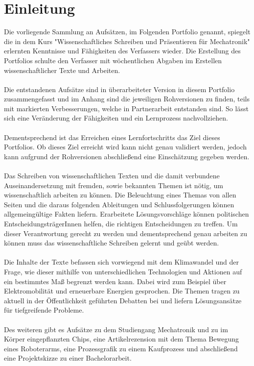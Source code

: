 \chapter{Einleitung}
Die vorliegende Sammlung an Aufsätzen, im Folgenden Portfolio genannt, spiegelt die in dem Kurs "Wissenschaftliches Schreiben und Präsentieren für Mechatronik" erlernten Kenntnisse und Fähigkeiten des Verfassers wieder. Die Erstellung des Portfolios schulte den Verfasser mit wöchentlichen Abgaben im Erstellen wissenschaftlicher Texte und Arbeiten. \\\\%
Die entstandenen Aufsätze sind in überarbeiteter Version in diesem Portfolio zusammengefasst und im Anhang sind die jeweiligen Rohversionen zu finden, teils mit markierten Verbesserungen, welche in Partnerarbeit entstanden sind. So lässt sich eine Veränderung der Fähigkeiten und ein Lernprozess nachvollziehen.\\\\
Dementsprechend ist das Erreichen eines Lernfortschritts das Ziel dieses Portfolios. Ob dieses Ziel erreicht wird kann nicht genau validiert werden, jedoch kann aufgrund der Rohversionen abschließend eine Einschätzung gegeben werden.\\\\
Das Schreiben von wissenschaftlichen Texten und die damit verbundene Auseinandersetzung mit fremden, sowie bekannten Themen ist nötig, um wissenschaftlich arbeiten zu können. Die Beleuchtung eines Themas von allen Seiten und die daraus folgenden Ableitungen und Schlussfolgerungen können allgemeingültige Fakten liefern. Erarbeitete Lösungsvorschläge können politischen EntscheidungsträgerInnen helfen, die richtigen Entscheidungen zu treffen. Um dieser Verantwortung gerecht zu werden und dementsprechend genau arbeiten zu können muss das wissenschaftliche Schreiben gelernt und geübt werden.\\\\
Die Inhalte der Texte befassen sich vorwiegend mit dem Klimawandel und der Frage, wie dieser mithilfe von unterschiedlichen Technologien und Aktionen auf ein bestimmtes Maß begrenzt werden kann. Dabei wird zum Beispiel über Elektromobilität und erneuerbare Energien gesprochen. Die Themen tragen zu aktuell in der Öffentlichkeit geführten Debatten bei und liefern Lösungsansätze für tiefgreifende Probleme.\\\\
Des weiteren gibt es Aufsätze zu dem Studiengang Mechatronik und zu im Körper eingepflanzten Chips, eine Artikelrezension mit dem Thema Bewegung eines Roboterarms, eine Prozessgrafik zu einem Kaufprozess und abschließend eine Projektskizze zu einer Bachelorarbeit.
